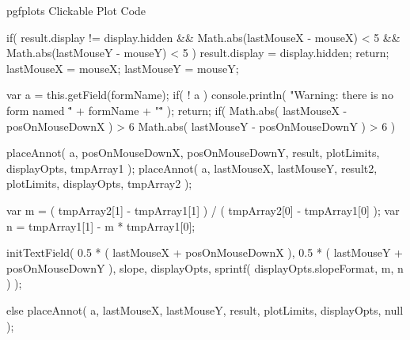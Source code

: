 \begin{insDLJS}[processAnnotatedPlot]{\jobname}{pgfplots Clickable Plot Code}
{	if( result.display != display.hidden && 
		Math.abs(lastMouseX - mouseX) < 5 &&
		Math.abs(lastMouseY - mouseY) < 5 ) 
	{
		result.display = display.hidden;
		return;
	}
	lastMouseX = mouseX;
	lastMouseY = mouseY;

	var a = this.getField(formName);
	if( ! a ) {
		console.println( "Warning: there is no form named \"" + formName + "\"" );
		return;
	}
	if( Math.abs( lastMouseX - posOnMouseDownX ) > 6 \pgfplotsVERTBAR\pgfplotsVERTBAR
		Math.abs( lastMouseY - posOnMouseDownY ) > 6 )
	{
		placeAnnot( a, posOnMouseDownX, posOnMouseDownY, result, plotLimits, displayOpts, tmpArray1 );
		placeAnnot( a, lastMouseX, lastMouseY, result2, plotLimits, displayOpts, tmpArray2 );

		var m =  ( tmpArray2[1] - tmpArray1[1] ) / ( tmpArray2[0] - tmpArray1[0] );
		var n =  tmpArray1[1] - m * tmpArray1[0];

		initTextField( 
			0.5 * ( lastMouseX + posOnMouseDownX ),
			0.5 * ( lastMouseY + posOnMouseDownY ),
			slope,
			displayOpts,
			sprintf( displayOpts.slopeFormat, m, n ) );

	} else {
		placeAnnot( a, lastMouseX, lastMouseY, result, plotLimits, displayOpts, null );
	}
}
\end{insDLJS}

\newif\ifpgfplots@clickable


